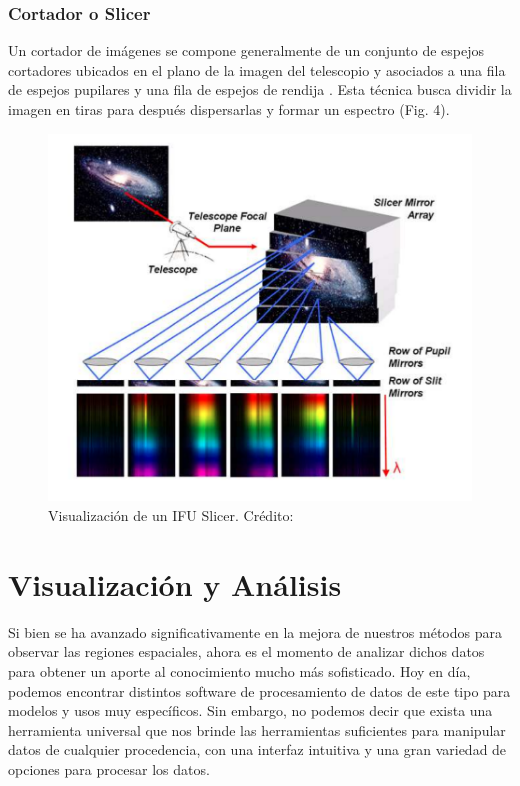 \documentclass[9pt,twocolumn,a4paper]{opticajnl}
\begin{document}
\subsubsection*{Cortador o Slicer}
Un cortador de imágenes se compone generalmente de un conjunto de espejos cortadores ubicados en el plano de la imagen del telescopio y asociados a una fila de espejos pupilares y una fila de espejos de rendija \cite{vives2005original}. Esta técnica busca dividir la imagen en tiras para después dispersarlas y formar un espectro (Fig. 4).
\begin{figure}
    \centering
    \includegraphics[width=1\linewidth]{slicerimg1.png}
    \caption{Visualización de un IFU Slicer. Crédito: \cite{vives2005original}}
    \label{fig:slicerimg1}
\end{figure}


\section*{Visualización y Análisis}
Si bien se ha avanzado significativamente en la mejora de nuestros métodos para observar las regiones espaciales, ahora es el momento de analizar dichos datos para obtener un aporte al conocimiento mucho más sofisticado. Hoy en día, podemos encontrar distintos software de procesamiento de datos de este tipo para modelos y usos muy específicos. Sin embargo, no podemos decir que exista una herramienta universal que nos brinde las herramientas suficientes para manipular datos de cualquier procedencia, con una interfaz intuitiva y una gran variedad de opciones para procesar los datos.
\end{document}
